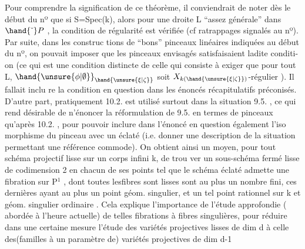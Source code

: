  

Pour comprendre la signification de ce théorème, il conviendrait
de noter dès le début du nº que  si S=Spec(k), alors pour une droite
L ``assez générale'' dans $\hand{\check{\ }}P$ ,  la condition de régularité est vérifiée
(cf ratrappages signalés au  nº).  Par suite, dans les construc%
tions de ``bons'' pinceaux linéaires  indiquées au début du nº, on pouvait
imposer que les pinceaux envisagés  satisfaisaient ladite conditi-
on  (ce qui  est une condition distincte de celle qui consiste à
exiger que pour tout \hand{$\unsure{\xi|\zeta}\in$}L,  $\hand{\unsure{\phi|\emptyset}}_{\hand{\unsure{\xi|\zeta}}}$  soit $X_{k(\hand{\unsure{\xi|\zeta}})}$-régulier ). Il fallait inclu
re la condition en question dans les énoncés récapitulatifs préconisés.
  D'autre part, pratiquement  10.2. est
utilisé surtout dans la situation 9.5. ,  ce qui  rend  désirable de
n'énoncer la réformulation de  9.5.  en termes de pinceaux qu'après
10.2. , pour pouvoir  inclure dans l'énoncé en question  également l'iso
morphisme du pinceau avec un éclaté (i.e. donner une description de la
situation  permettant une référence commode).  On obtient ainsi un
moyen, pour tout schéma projectif lisse sur un corps infini k,  de trou
ver un sous-schéma fermé lisse  de codimension 2 en chacun de
ses points 
 tel que le schéma éclaté admette une fibration
sur P$^1$ , dont toutes les\hand{/}fibres sont lisses sont au plus un nombre fini,
ces dernières ayant au plus un point  géom. singulier, et
un tel point   rationnel sur k et géom. singulier ordinaire .  Cela
explique l'importance  de l'étude approfondie (  abordée à l'heure
actuelle) de telles fibrations à fibres singulières, pour réduire dans 
une certaine mesure l'étude des variétés projectives lisses de dim d
à celle des(familles à un paramètre de) variétés projectives de dim d-1\hand{,}


